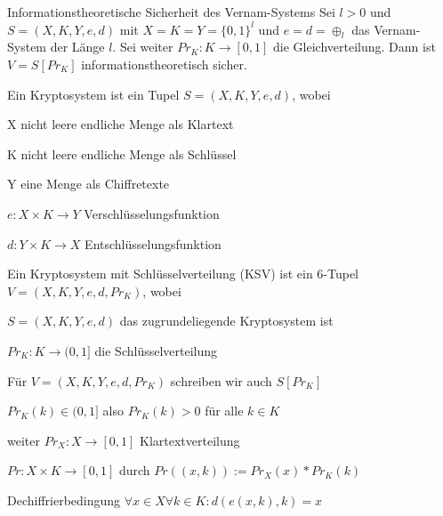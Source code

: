 \documentclass[avery5371, frame]{flashcards}
\begin{document}

\begin{flashcard}{Informationstheoretische Sicherheit des Vernam-Systems} Sei $l>0$ und $S=(X,K,Y,e,d)$ mit $X=K=Y=\{0,1\}^l$ und $e=d=\oplus_l$ das Vernam-System der Länge $l$. Sei weiter $Pr_K:K\rightarrow [0,1]$ die Gleichverteilung. Dann ist $V=S[Pr_K]$ informationstheoretisch sicher.
\end{flashcard}

\begin{flashcard}[Kryptosysteme]{Ein Kryptosystem ist ein Tupel $S=(X,K,Y,e,d)$, wobei}
    \begin{itemize*}
        \item X nicht leere endliche Menge als Klartext
        \item K nicht leere endliche Menge als Schlüssel
        \item Y eine Menge als Chiffretexte
        \item $e:X\times K\rightarrow Y$ Verschlüsselungsfunktion
        \item $d:Y\times K\rightarrow X$ Entschlüsselungsfunktion
    \end{itemize*}
\end{flashcard}

\begin{flashcard}{Ein Kryptosystem mit Schlüsselverteilung (KSV) ist ein 6-Tupel $V=(X,K,Y,e,d,Pr_K)$, wobei}
    \begin{itemize*}
        \item $S=(X,K,Y,e,d)$ das zugrundeliegende Kryptosystem ist
        \item $Pr_K:K\rightarrow (0,1]$ die Schlüsselverteilung
        \item Für $V=(X,K,Y,e,d,Pr_K)$ schreiben wir auch $S[Pr_K]$
        \item $Pr_K(k)\in (0,1]$ also $Pr_K(k)> 0$ für alle $k\in K$
        \item weiter $Pr_X:X\rightarrow [0,1]$ Klartextverteilung
        \item $Pr:X\times K\rightarrow [0,1]$ durch $Pr((x,k)):=Pr_X(x)*Pr_K(k)$
    \end{itemize*}
\end{flashcard}

\begin{flashcard}[Kryptosysteme]{Dechiffrierbedingung}
    $\forall x\in X\forall k\in K:d(e(x,k),k) =x$
\end{flashcard}
\end{document}
